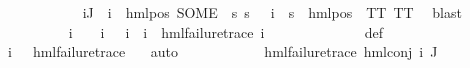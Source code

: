 \begin{isabellebody}
\ \ \ \ \ \ \ \ \ \ \ \ \isamarkupfalse%
\ {\isacartoucheopen}{\isasymforall}i{\isasymin}J{\isachardot}{\kern0pt}\ {\isasymPsi}\ i\ {\isacharequal}{\kern0pt}\ hml{\isacharunderscore}{\kern0pt}pos\ {\isacharparenleft}{\kern0pt}SOME\ {\isasymalpha}{\isachardot}{\kern0pt}\ {\isasymforall}s{\isachardot}{\kern0pt}\ {\isacharparenleft}{\kern0pt}s\ {\isasymTurnstile}\ {\isasymPhi}\ i{\isacharparenright}{\kern0pt}\ {\isacharequal}{\kern0pt}\ {\isacharparenleft}{\kern0pt}s\ {\isasymTurnstile}\ hml{\isacharunderscore}{\kern0pt}pos\ {\isasymalpha}\ TT{\isacharparenright}{\kern0pt}{\isacharparenright}{\kern0pt}\ TT{\isacartoucheclose}\ \isamarkupfalse%
\ blast\isanewline
\ \ \ \ \ \ \ \ \ \ \isamarkupfalse%
\ {\isachardoublequoteopen}{\isacharparenleft}{\kern0pt}{\isasymexists}i\ {\isasymin}\ {\isasymPsi}\ {\isacharbackquote}{\kern0pt}\ {\isacharbraceleft}{\kern0pt}i{\isacharunderscore}{\kern0pt}{\isasymphi}{\isacharbraceright}{\kern0pt}{\isachardot}{\kern0pt}\ {\isasymPsi}\ {\isacharbackquote}{\kern0pt}\ {\isacharbraceleft}{\kern0pt}i{\isacharunderscore}{\kern0pt}{\isasymphi}{\isacharbraceright}{\kern0pt}\ {\isacharequal}{\kern0pt}\ {\isacharbraceleft}{\kern0pt}i{\isacharbraceright}{\kern0pt}\ {\isasymand}\ hml{\isacharunderscore}{\kern0pt}failure{\isacharunderscore}{\kern0pt}trace\ i{\isacharparenright}{\kern0pt}{\isachardoublequoteclose}\isanewline
\ \ \ \ \ \ \ \ \ \ \ \ \isamarkupfalse%
\ {\isasymPsi}{\isacharunderscore}{\kern0pt}def\isanewline
\ \ \ \ \ \ \ \ \ \ \ \ \isamarkupfalse%
\ {\isacartoucheopen}{\isasymPsi}\ {\isacharbackquote}{\kern0pt}\ {\isacharbraceleft}{\kern0pt}i{\isacharunderscore}{\kern0pt}{\isasymphi}{\isacharbraceright}{\kern0pt}\ {\isacharequal}{\kern0pt}\ {\isacharbraceleft}{\kern0pt}{\isasympsi}{\isacharbraceright}{\kern0pt}{\isacartoucheclose}\ {\isacartoucheopen}hml{\isacharunderscore}{\kern0pt}failure{\isacharunderscore}{\kern0pt}trace\ {\isasympsi}{\isacartoucheclose}\ \isamarkupfalse%
\ auto\isanewline
\ \ \ \ \ \ \ \ \ \ \isamarkupfalse%
\ {\isachardoublequoteopen}hml{\isacharunderscore}{\kern0pt}failure{\isacharunderscore}{\kern0pt}trace\ {\isacharparenleft}{\kern0pt}hml{\isacharunderscore}{\kern0pt}conj\ {\isacharbraceleft}{\kern0pt}i{\isacharunderscore}{\kern0pt}{\isasymphi}{\isacharbraceright}{\kern0pt}\ J\ {\isasymPsi}{\isacharparenright}{\kern0pt}{\isachardoublequoteclose}\isanewline
\ \ \ \ \ \ \ \ \ \ \ \ \isamarkupfalse%

\end{isabellebody}
